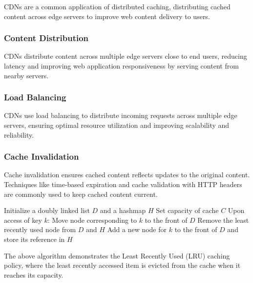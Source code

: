 \documentclass[12pt]{book} %
\begin{document}
CDNs are a common application of distributed caching, distributing cached content across edge servers to improve web content delivery to users.

\subsubsection{Content Distribution}

CDNs distribute content across multiple edge servers close to end users, reducing latency and improving web application responsiveness by serving content from nearby servers.

\subsubsection{Load Balancing}

CDNs use load balancing to distribute incoming requests across multiple edge servers, ensuring optimal resource utilization and improving scalability and reliability.

\subsubsection{Cache Invalidation}

Cache invalidation ensures cached content reflects updates to the original content. Techniques like time-based expiration and cache validation with HTTP headers are commonly used to keep cached content current.


\FloatBarrier
\begin{algorithm}
\caption{Least Recently Used (LRU) Cache}
\begin{algorithmic}[1]
\State Initialize a doubly linked list $D$ and a hashmap $H$
\State Set capacity of cache $C$
\State Upon access of key $k$:
    \State Move node corresponding to $k$ to the front of $D$
\Else
        \State Remove the least recently used node from $D$ and $H$
    \EndIf
    \State Add a new node for $k$ to the front of $D$ and store its reference in $H$
\EndIf
\end{algorithmic}
\end{algorithm}
\FloatBarrier

The above algorithm demonstrates the Least Recently Used (LRU) caching policy, where the least recently accessed item is evicted from the cache when it reaches its capacity.
\end{document}
